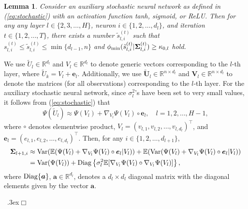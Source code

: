 \documentclass[11pt]{article}
\newcommand{\be}{{\boldsymbol e}}
\newcommand{\bw}{{\boldsymbol w}}
\newcommand{\ba}{{\boldsymbol a}}
\newcommand{\bV}{{\boldsymbol V}}
\newcommand{\bU}{{\boldsymbol U}}
\newcommand{\Var}{{\rm Var}}
\newcommand{\diag}{{\rm Diag}}
\newcommand{\bSigma}{{\boldsymbol \Sigma}}
\newtheorem{lemma}{Lemma}[section]
\newenvironment{proof}{\trivlist\item[\hskip \labelsep{\sc Proof:}]}
 {\unskip\nobreak\ \lower.3ex\hbox{$\Box$}\endtrivlist}
\begin{document}
  
\begin{lemma} \label{lemma:mineigen} Consider an auxiliary stochastic neural network 
as defined in (\ref{eq:stochastic}) with an activation function {\it tanh, sigmoid}, or {\it ReLU}. Then for any  any layer $l \in \{2,3,\ldots,H\}$, neuron $i \in\{1,2,\ldots,d_l\}$, and 
iteration $t\in \{1,2,\ldots,T\}$, there exists a number $\tilde{s}_{l,i}^{(t)}$ such that 
$s_{l,i}^{(t)} \leq \tilde{s}_{l,i}^{(t)} \leq \min\{d_{l-1},n\}$ and $\phi_{\rm \min}(\tilde{s}_{l,i}^{(t)}|\bSigma_{l,i}^{(t)}) \geq  \kappa_{0,l}$ hold. 
\end{lemma}
\begin{proof}
We use $\tilde{U}_l \in \mathbb{R}^{d_l}$ and $V_l \in \mathbb{R}^{d_l}$ to denote generic vectors corresponding to the $l$-th layer, where $\tilde{U}_k=V_l+\be_l$. 
 Additionally, we use $\tilde{\bU}_l \in \mathbb{R}^{n\times d_l}$ and $\bV_l \in \mathbb{R}^{n\times d_l}$ to denote the matrices (for all observations) corresponding to the $l$-th layer. 
For the auxiliary  stochastic neural network, since $\sigma_l^2$'s have been set to very small values,  it follows from (\ref{eq:stochastic}) that 
\[
\Psi(\tilde{U}_{l}) \approx \Psi(V_{l}) + \nabla_{V_{l}}\Psi(V_{l}) \circ \be_l, \quad l=1,2,\ldots,H-1,
\]
where $\circ$ denotes elementwise product, 
$V_l=(v_{l,1},v_{l,2},\ldots, v_{l,d_l})^{\top}$, 
and $\be_l=(e_{l,1},e_{l,2},\ldots,e_{l,d_l})^{\top}$.
Then, for any $i \in \{1,2,\ldots, d_{l+1}\}$, 
\begin{equation}
\label{recursive_covariance}
\begin{split}
\bSigma_{l+1,i} &\approx \Var(\mathbb{E} (\Psi(V_l) + \nabla_{V_l}\Psi(V_l) \circ \be_l | V_l ) ) + \mathbb{E}(\Var(\Psi(V_l) + \nabla_{V_l}\Psi(V_l) \circ \be_l | V_l)) \\
& = \Var(\Psi(V_l)) + \diag\left\{\sigma_{l}^2 \mathbb{E}[\nabla_{V_l}\Psi(V_l) \circ \nabla_{V_l}\Psi(V_l)] \right\}, \\
\end{split}    
\end{equation}
where $\diag\{\ba\}$, $\ba\in \mathbb{R}^{d_l}$, denotes a $d_l \times d_l$ diagonal matrix with the diagonal elements given by the vector $\ba$.


\end{proof}
\end{document}
